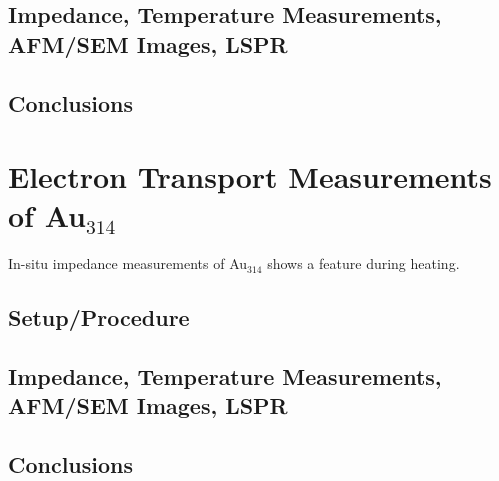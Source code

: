 \documentclass[12pt,oneside,english]{article}
\begin{document}
    \subsection{Impedance, Temperature Measurements, AFM/SEM Images, LSPR}
    \subsection{Conclusions}

    \section{Electron Transport Measurements of Au$_{314}$}
    In-situ impedance measurements of Au$_{314}$ shows a feature during heating.
    \subsection{Setup/Procedure}
    \subsection{Impedance, Temperature Measurements, AFM/SEM Images, LSPR}
    \subsection{Conclusions}


\clearpage


\clearpage


\end{document}
